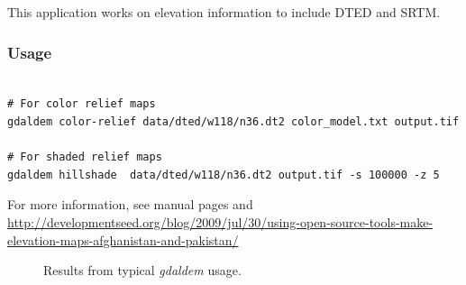 This application works on elevation information to include DTED and SRTM.

\subsubsection*{Usage}
\begin{verbatim}

# For color relief maps
gdaldem color-relief data/dted/w118/n36.dt2 color_model.txt output.tif

# For shaded relief maps
gdaldem hillshade  data/dted/w118/n36.dt2 output.tif -s 100000 -z 5

\end{verbatim}
For more information, see manual pages and \url{http://developmentseed.org/blog/2009/jul/30/using-open-source-tools-make-elevation-maps-afghanistan-and-pakistan/}

\begin{figure}[!h]
\caption{Results from typical \emph{gdaldem} usage.}
\label{fig:gdaldem_usage}
\end{figure}


